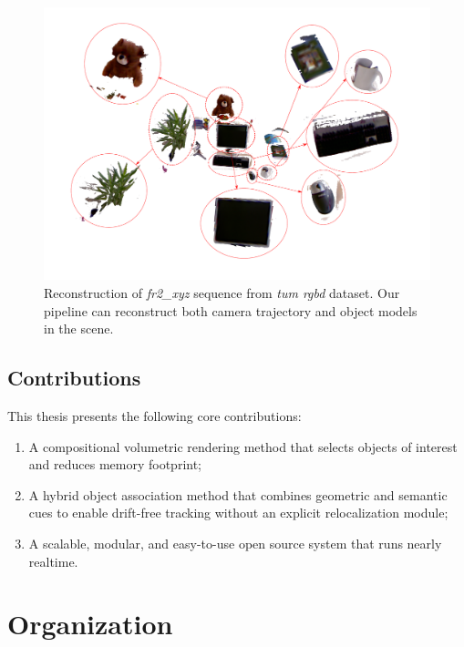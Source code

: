 \begin{figure}[t!]
    \centering
    \includegraphics[width=\linewidth]{figs/teaser.pdf}\vspace{-1cm}
    \caption{Reconstruction of \textit{fr2\_xyz} sequence from \emph{tum rgbd} dataset. Our pipeline can reconstruct both camera trajectory and object models in the scene.}
    \label{fig:objectsandscene}
\end{figure}

\subsection{Contributions}

This thesis presents the following core contributions:

\begin{enumerate}
    \item A compositional volumetric rendering method that selects objects of interest and reduces memory footprint;
    \item A hybrid object association method that combines geometric and semantic cues to enable drift-free tracking without an explicit relocalization module;
    \item A scalable, modular, and easy-to-use open source system that runs nearly realtime.
\end{enumerate}

\section{Organization}



